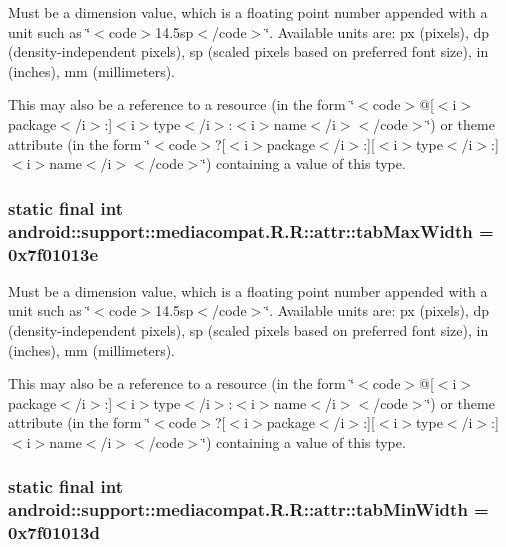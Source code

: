 Must be a dimension value, which is a floating point number appended with a unit such as \char`\"{}$<$code$>$14.5sp$<$/code$>$\char`\"{}. Available units are: px (pixels), dp (density-independent pixels), sp (scaled pixels based on preferred font size), in (inches), mm (millimeters). 

This may also be a reference to a resource (in the form \char`\"{}$<$code$>$@\mbox{[}$<$i$>$package$<$/i$>$:\mbox{]}$<$i$>$type$<$/i$>$:$<$i$>$name$<$/i$>$$<$/code$>$\char`\"{}) or theme attribute (in the form \char`\"{}$<$code$>$?\mbox{[}$<$i$>$package$<$/i$>$:\mbox{]}\mbox{[}$<$i$>$type$<$/i$>$:\mbox{]}$<$i$>$name$<$/i$>$$<$/code$>$\char`\"{}) containing a value of this type. \hypertarget{classandroid_1_1support_1_1mediacompat_1_1_r_1_1attr_1c716fc62908c794d5916517896fe233}{
\subsubsection[{tabMaxWidth}]{\setlength{\rightskip}{0pt plus 5cm}static final int android::support::mediacompat.R.R::attr::tabMaxWidth = 0x7f01013e}}
\label{classandroid_1_1support_1_1mediacompat_1_1_r_1_1attr_1c716fc62908c794d5916517896fe233}


Must be a dimension value, which is a floating point number appended with a unit such as \char`\"{}$<$code$>$14.5sp$<$/code$>$\char`\"{}. Available units are: px (pixels), dp (density-independent pixels), sp (scaled pixels based on preferred font size), in (inches), mm (millimeters). 

This may also be a reference to a resource (in the form \char`\"{}$<$code$>$@\mbox{[}$<$i$>$package$<$/i$>$:\mbox{]}$<$i$>$type$<$/i$>$:$<$i$>$name$<$/i$>$$<$/code$>$\char`\"{}) or theme attribute (in the form \char`\"{}$<$code$>$?\mbox{[}$<$i$>$package$<$/i$>$:\mbox{]}\mbox{[}$<$i$>$type$<$/i$>$:\mbox{]}$<$i$>$name$<$/i$>$$<$/code$>$\char`\"{}) containing a value of this type. \hypertarget{classandroid_1_1support_1_1mediacompat_1_1_r_1_1attr_73d57f7d1c45a37a84b29e1ad0e282cd}{
\subsubsection[{tabMinWidth}]{\setlength{\rightskip}{0pt plus 5cm}static final int android::support::mediacompat.R.R::attr::tabMinWidth = 0x7f01013d}}
\label{classandroid_1_1support_1_1mediacompat_1_1_r_1_1attr_73d57f7d1c45a37a84b29e1ad0e282cd}


